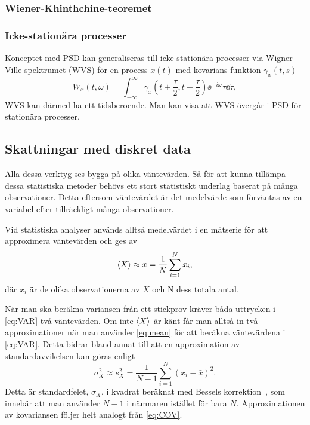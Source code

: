 \subsubsection{Wiener-Khinthchine-teoremet}


\subsubsection{Icke-stationära processer}

Konceptet med PSD kan generaliseras till icke-stationära processer via Wigner-Ville-spektrumet (WVS) för en process $x(t)$ med kovarians funktion $\gamma_x(t,s)$ \cite{Flandrin_fBmspektrum1989}
\begin{equation} \label{eq:WVS}
    W_x(t,\omega)=\int^{\infty}_{-\infty} \gamma_x\left(t+\frac{\tau}{2},t-\frac{\tau}{2}\right) \ee^{-i\omega}\tau \dd\tau,
\end{equation}
WVS kan därmed ha ett tidsberoende. Man kan visa att WVS övergår i PSD för stationära processer.

\subsection{Skattningar med diskret data} \label{sec:diskret_data}
Alla dessa verktyg ses bygga på olika väntevärden. Så för att kunna tillämpa
dessa statistiska metoder behövs ett stort statistiskt underlag baserat på
många observationer. Detta eftersom väntevärdet är det medelvärde
som förväntas av en variabel efter tillräckligt många observationer.

Vid statistiska analyser används alltså medelvärdet i en
mätserie för att approximera väntevärden och ges av
\begin{equation}\label{eq:mean}
\ev{X} \approx \bar{x} = \frac{1}{N} \sum_{i=1}^N x_i,
\end{equation}
där $x_i$ är de olika observationerna av $X$ och N dess totala antal. 

När man ska beräkna variansen från ett stickprov kräver båda uttrycken
i \eqref{eq:VAR} två väntevärden. Om inte $\ev{X}$ är känt får man
alltså in två approximationer när man använder \eqref{eq:mean} för att
beräkna väntevärdena i \eqref{eq:VAR}. Detta bidrar bland annat till att en approximation av standardavvikelsen kan göras enligt
\begin{equation}
\sigma_X^2 \approx s_X^2
=  \frac{1}{N-1} \sum_{i=1}^N \left(x_i-\bar{x}\right)^2.
\end{equation}
Detta är standardfelet, $\bar{\sigma}_X$, i kvadrat beräknat med
Bessels korrektion~\cite{Rice_matstat2006}, som innebär att man använder ${N-1}$
i nämnaren istället för bara $N$. Approximationen av kovariansen
följer helt analogt från \eqref{eq:COV}.

